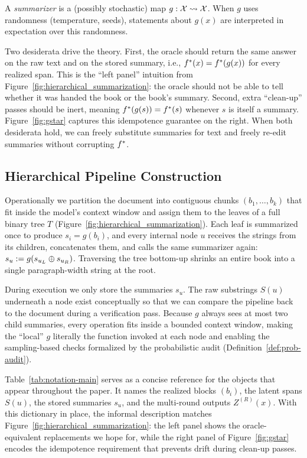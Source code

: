 \begin{definition}[Summarizer]\label{def:summarizer}
A \emph{summarizer} is a (possibly stochastic) map $g: \mathcal{X} \rightsquigarrow \mathcal{X}$. When $g$ uses randomness (temperature, seeds), statements about $g(x)$ are interpreted in expectation over this randomness.
\end{definition}

Two desiderata drive the theory. First, the oracle should return the same answer on the raw text and on the stored summary, i.e., $f^{\ast}(x) = f^{\ast}(g(x))$ for every realized span. This is the ``left panel'' intuition from Figure~\ref{fig:hierarchical_summarization}: the oracle should not be able to tell whether it was handed the book or the book's summary. Second, extra ``clean-up'' passes should be inert, meaning $f^{\ast}(g(s)) = f^{\ast}(s)$ whenever $s$ is itself a summary. Figure~\ref{fig:gstar} captures this idempotence guarantee on the right. When both desiderata hold, we can freely substitute summaries for text and freely re-edit summaries without corrupting $f^{\ast}$.

\subsection{Hierarchical Pipeline Construction}

Operationally we partition the document into contiguous chunks $(b_1,\dots,b_k)$ that fit inside the model's context window and assign them to the leaves of a full binary tree $T$ (Figure~\ref{fig:hierarchical_summarization}). Each leaf is summarized once to produce $s_i = g(b_i)$, and every internal node $u$ receives the strings from its children, concatenates them, and calls the same summarizer again: $s_u := g(s_{u_L} \oplus s_{u_R})$. Traversing the tree bottom-up shrinks an entire book into a single paragraph-width string at the root.

During execution we only store the summaries $s_u$. The raw substrings $S(u)$ underneath a node exist conceptually so that we can compare the pipeline back to the document during a verification pass. Because $g$ always sees at most two child summaries, every operation fits inside a bounded context window, making the ``local'' $g$ literally the function invoked at each node and enabling the sampling-based checks formalized by the probabilistic audit (Definition~\ref{def:prob-audit}).

Table~\ref{tab:notation-main} serves as a concise reference for the objects that appear throughout the paper. It names the realized blocks $(b_i)$, the latent spans $S(u)$, the stored summaries $s_u$, and the multi-round outputs $Z^{(R)}(x)$. With this dictionary in place, the informal description matches Figure~\ref{fig:hierarchical_summarization}: the left panel shows the oracle-equivalent replacements we hope for, while the right panel of Figure~\ref{fig:gstar} encodes the idempotence requirement that prevents drift during clean-up passes.

